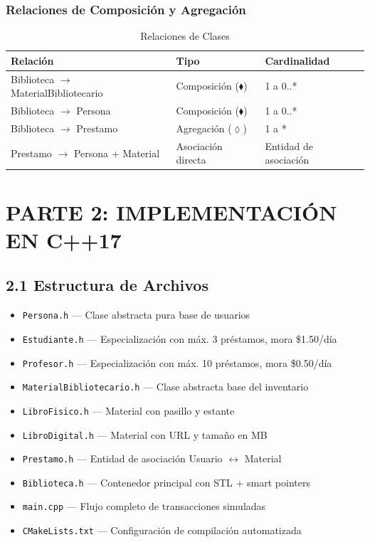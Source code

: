\documentclass[12pt,a4paper]{article}
\begin{document}
\subsubsection*{Relaciones de Composición y Agregación}
\begin{table}[h!]
\centering
\begin{tabular}{|l|l|l|}
\hline
\textbf{Relación} & \textbf{Tipo} & \textbf{Cardinalidad} \\ \hline
Biblioteca $\rightarrow$ MaterialBibliotecario & Composición ($\blacklozenge$) & 1 a 0..* \\ \hline
Biblioteca $\rightarrow$ Persona & Composición ($\blacklozenge$) & 1 a 0..* \\ \hline
Biblioteca $\rightarrow$ Prestamo & Agregación ($\lozenge$) & 1 a * \\ \hline
Prestamo $\rightarrow$ Persona + Material & Asociación directa & Entidad de asociación \\ \hline
\end{tabular}
\caption{Relaciones de Clases}
\end{table}

\section{PARTE 2: IMPLEMENTACIÓN EN C++17}

\subsection{2.1 Estructura de Archivos}
\begin{itemize}
    \item \texttt{Persona.h} — Clase abstracta pura base de usuarios
    \item \texttt{Estudiante.h} — Especialización con máx. 3 préstamos, mora \$1.50/día
    \item \texttt{Profesor.h} — Especialización con máx. 10 préstamos, mora \$0.50/día
    \item \texttt{MaterialBibliotecario.h} — Clase abstracta base del inventario
    \item \texttt{LibroFisico.h} — Material con pasillo y estante
    \item \texttt{LibroDigital.h} — Material con URL y tamaño en MB
    \item \texttt{Prestamo.h} — Entidad de asociación Usuario $\leftrightarrow$ Material
    \item \texttt{Biblioteca.h} — Contenedor principal con STL + smart pointers
    \item \texttt{main.cpp} — Flujo completo de transacciones simuladas
    \item \texttt{CMakeLists.txt} — Configuración de compilación automatizada
\end{itemize}
\end{document}
